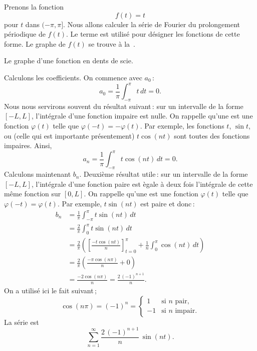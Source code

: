 \begin{example}
Prenons la fonction
\begin{equation*}
f(t) = t
\end{equation*}
pour $t$ dans $(-\pi,\pi]$. Nous allons calculer la série de Fourier du prolongement périodique de $f(t)$.  Le terme \emph{} est utilisé pour désigner les fonctions de cette forme.  Le graphe de $f(t)$ se trouve à la~.

\begin{myfig}
\capstart
{}
\caption{Le graphe d'une fonction en dents de scie.\label{ts:sawtoothfig}}
\end{myfig}
Calculons les coefficients. On commence avec  $a_0$\,: 
\begin{equation*}
a_0 = \frac{1}{\pi} \int_{-\pi}^\pi t \,dt = 0 .
\end{equation*}
Nous nous servirons souvent du résultat suivant\,: sur un intervalle de la forme $[-L,L]$,  l'intégrale d'une fonction impaire est nulle. On rappelle qu'une 
\emph{} est une fonction 
 $\varphi(t)$ telle que $\varphi(-t) = -\varphi(t)$.  Par exemple, les fonctions $t$, $\sin t$, ou (celle qui est importante présentement)
$t \cos (nt)$ sont toutes des fonctions impaires.  Ainsi,
\begin{equation*}
a_n = \frac{1}{\pi} \int_{-\pi}^\pi t \cos (nt) \,dt = 0 .
\end{equation*}
Calculons maintenant $b_n$.  Deuxième résultat utile\,: sur un intervalle de la forme $[-L,L]$, l'intégrale d'une fonction paire est ègale à deux fois l'intégrale de cette même fonction sur $[0,L]$. On rappelle qu'une  \emph{}
est une fonction $\varphi(t)$ telle que  $\varphi(-t) = \varphi(t)$.  Par exemple,
$t \sin (nt)$ est paire et donc\,: 
\begin{equation*}
\begin{split}
b_n & = \frac{1}{\pi} \int_{-\pi}^\pi t \sin (nt) \,dt \\
& = \frac{2}{\pi} \int_{0}^\pi t \sin (nt) \,dt \\
& = \frac{2}{\pi} \left(
\left[ \frac{-t \cos (nt)}{n} \right]_{t=0}^{\pi}
+
\frac{1}{n}
\int_{0}^\pi \cos (nt) \,dt
\right)
\\
& = \frac{2}{\pi} \left(
\frac{-\pi \cos (n\pi)}{n}
+
0
\right) \\
& =  \frac{-2 \cos (n\pi)}{n}
=  \frac{2 \,{(-1)}^{n+1}}{n} .
\end{split}
\end{equation*}
On a utilisé ici le fait suivant\,;  
\begin{equation*}
\cos (n\pi) = {(-1)}^n =
\begin{cases}
1 & \text{si } n \text{ pair} , \\
-1 & \text{si } n \text{ impair} .
\end{cases}
\end{equation*}
La série est
\begin{equation*}
\sum_{n=1}^\infty
\frac{2 \,{(-1)}^{n+1}}{n} \,
\sin (n t) .
\end{equation*}


\end{example}
